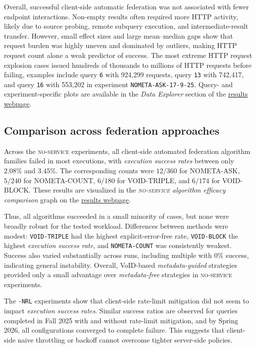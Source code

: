 \documentclass[runningheads]{llncs}
\begin{document}
Overall, successful client-side automatic federation was not associated with fewer endpoint interactions. 
Non-empty results often required more HTTP activity, likely due to source probing, remote subquery execution, and intermediate-result transfer. 
However, small effect sizes and large mean--median gaps show that request burden was highly uneven and dominated by outliers, making HTTP request count alone a weak predictor of success. 
The most extreme HTTP request explosion cases issued hundreds of thousands to millions of HTTP requests before failing, examples include query \texttt{6} with 924{,}299 requests, query \texttt{13} with 742{,}417, and query \texttt{16} with 553{,}202 in experiment \texttt{NOMETA-ASK-17-9-25}.
Query- and experiment-specific plots are available in the \textit{Data Explorer} section of the \href{https://ecrum19.github.io/fed-survey-results/}{results webpage}.


\subsection{Comparison across federation approaches}\label{sec5.4}
Across the \textsc{no-service} experiments, all client-side automated federation algorithm families failed in most executions, with \emph{execution success rates} between only \(2.08\%\) and \(3.45\%\).
The corresponding counts were \(12/360\) for \textsc{NOMETA-ASK}, \(5/240\) for \textsc{NOMETA-COUNT}, \(6/180\) for \textsc{VOID-TRIPLE}, and \(6/174\) for \textsc{VOID-BLOCK}.
These results are visualized in the \textit{\textsc{no-service} algorithm efficacy comparison} graph on the \href{https://ecrum19.github.io/fed-survey-results/}{results webpage}.

Thus, all algorithms succeeded in a small minority of cases, but none were broadly robust for the tested workload. 
Differences between methods were modest: \texttt{VOID-TRIPLE} had the highest explicit-error-free rate, \texttt{VOID-BLOCK} the highest \emph{execution success rate}, and \texttt{NOMETA-COUNT} was consistently weakest. 
Success also varied substantially across runs, including multiple with \(0\%\) success, indicating general instability. 
Overall, VoID-based \textit{metadata-guided} strategies provided only a small advantage over \textit{metadata-free} strategies in \textsc{no-service} experiments.

The \texttt{-NRL} experiments show that client-side rate-limit mitigation did not seem to impact \emph{execution success rates}. 
Similar success ratios are observed for queries completed in Fall 2025 with and without rate-limit mitigation, and by Spring 2026, all configurations converged to complete failure. 
This suggests that client-side naive throttling or backoff cannot overcome tighter server-side policies.
\end{document}
